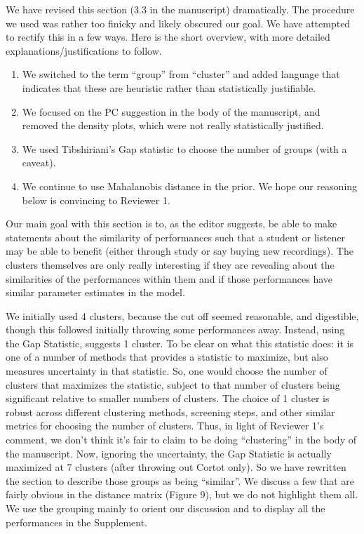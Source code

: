 \documentclass[12pt]{article}
\newenvironment{resp}{\color{cobalt}}{}
\begin{document}
\begin{resp}
  We have revised this section (3.3 in the manuscript) dramatically. The procedure we used was rather too finicky and likely obscured our goal. We have attempted to rectify this in a few ways. Here is the short overview, with more detailed explanations/justifications to follow.
  \begin{enumerate}
  \item We switched to the term ``group'' from ``cluster'' and added language that indicates that these are heuristic rather than statistically justifiable.
  \item We focused on the PC suggestion in the body of the manuscript, and removed the density plots, which were not really statistically justified.
  \item We used Tibshiriani's Gap statistic to choose the number of groups (with a caveat).
  \item We continue to use Mahalanobis distance in the prior. We hope our reasoning below is convincing to Reviewer 1.
  \end{enumerate}
  
    Our main goal with this section is to, as the editor suggests, be able to make statements about the similarity of performances such that a student or listener may be able to benefit (either through study or say buying new recordings). The clusters themselves are only really interesting if they are revealing about the similarities of the performances  within them and if those performances have similar parameter estimates in the model.

    We initially used 4 clusters, because the cut off seemed reasonable, and digestible, though this followed initially throwing some performances away. Instead, using the Gap Statistic, suggests 1 cluster. To be clear on what this statistic does: it is one of a number of methods that provides a statistic to maximize, but also measures uncertainty in that statistic. So, one would choose the number of clusters that maximizes the statistic, subject to that number of clusters being significant relative to smaller numbers of clusters.  The choice of 1 cluster is robust across different clustering methods, screening steps, and other similar metrics for choosing the number of clusters. Thus, in light of Reviewer 1's comment, we don't think it's fair to claim to be doing ``clustering'' in the body of the manuscript. Now, ignoring the uncertainty, the Gap Statistic is actually maximized at 7 clusters (after throwing out Cortot only). So we have rewritten the section to describe those groups as being ``similar''. We discuss a few that are fairly obvious in the distance matrix (Figure 9), but we do not highlight them all. We use the grouping mainly to orient our discussion and to display all the performances in the Supplement.


\end{resp}
\end{document}
